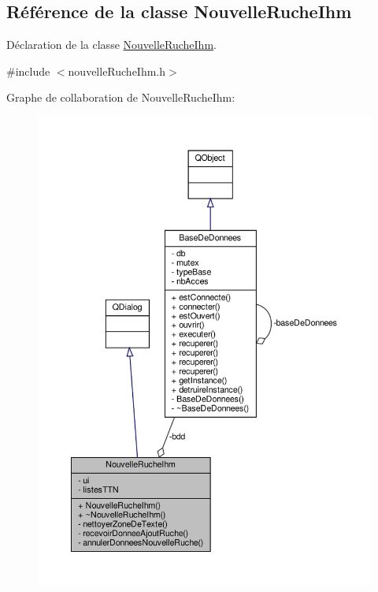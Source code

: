 \hypertarget{class_nouvelle_ruche_ihm}{}\subsection{Référence de la classe Nouvelle\+Ruche\+Ihm}
\label{class_nouvelle_ruche_ihm}


Déclaration de la classe \hyperlink{class_nouvelle_ruche_ihm}{Nouvelle\+Ruche\+Ihm}.  




{\ttfamily \#include $<$nouvelle\+Ruche\+Ihm.\+h$>$}



Graphe de collaboration de Nouvelle\+Ruche\+Ihm\+:\nopagebreak
\begin{figure}[H]
\begin{center}
\leavevmode
\includegraphics[width=350pt]{class_nouvelle_ruche_ihm__coll__graph}
\end{center}
\end{figure}
